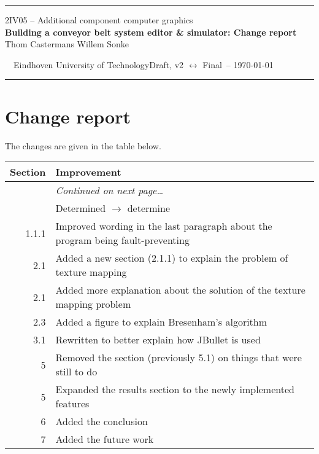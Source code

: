 \documentclass[a4paper,10pt]{article}
\newcommand*{\accgtitle}{Building a conveyor belt system editor \& simulator: Change report\xspace}
\newcommand*{\accgversion}{Draft, v2 $\leftrightarrow$ Final\xspace}
\begin{document}
\begin{adjustwidth}{0.05\textwidth}{0.05\textwidth}  
  \textcolor{accgblue}{\rule{0.9\textwidth}{0.8pt}}
  
  \begin{center}
    \large 2IV05 -- Additional component computer graphics\\
    \Large\textbf{\accgtitle}\\[10pt]
    \normalsize Thom Castermans \qquad Willem Sonke
  \end{center}
  
  \vspace{10pt}\noindent\footnotesize~~Eindhoven University of Technology\hfill\accgversion\ -- \today~~
  
  \vspace{-6pt}\noindent\textcolor{accgblue}{\rule{0.9\textwidth}{0.8pt}}
\end{adjustwidth}

\begin{abstract}
 This document details the changes between the second draft version of the report (version ``Draft, v2'' of 14 March 2014) and the final version (version ``Final'' of 22 April 2014).
\end{abstract}

\section*{Change report}
The changes are given in the table below.

\begin{longtabu}{r>{\raggedright}X<{\strut}}
  \toprule
  \textbf{Section} & \textbf{Improvement} \\
  \midrule
  \endhead
  \bottomrule
  & \vspace*{-5pt}\hfill\textit{Continued on next page\ldots} \\
  \endfoot
  \bottomrule
   & Determined $\rightarrow$ determine \\
  1.1.1 & Improved wording in the last paragraph about the program being fault-preventing \\
  2.1 & Added a new section (2.1.1) to explain the problem of texture mapping \\
  2.1 & Added more explanation about the solution of the texture mapping problem \\
  2.3 & Added a figure to explain Bresenham's algorithm \\
  3.1 & Rewritten to better explain how JBullet is used \\
  5 & Removed the section (previously 5.1) on things that were still to do \\
  5 & Expanded the results section to the newly implemented features \\
  6 & Added the conclusion \\
  7 & Added the future work \\
\end{longtabu}
\end{document}
